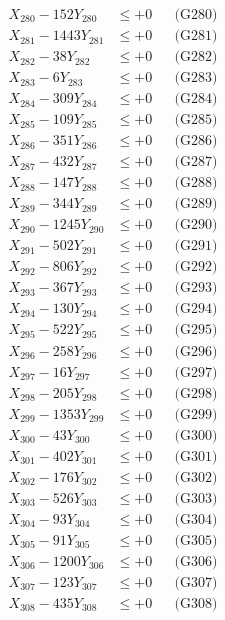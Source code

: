 \documentclass[a4paper,10pt]{article}
\begin{document}
{\begin{align}
X_{280} - 152Y_{280} &\leq +0 && \text{(G280)} \\
\allowbreak
X_{281} - 1443Y_{281} &\leq +0 && \text{(G281)} \\
X_{282} - 38Y_{282} &\leq +0 && \text{(G282)} \\
X_{283} - 6Y_{283} &\leq +0 && \text{(G283)} \\
X_{284} - 309Y_{284} &\leq +0 && \text{(G284)} \\
X_{285} - 109Y_{285} &\leq +0 && \text{(G285)} \\
X_{286} - 351Y_{286} &\leq +0 && \text{(G286)} \\
X_{287} - 432Y_{287} &\leq +0 && \text{(G287)} \\
X_{288} - 147Y_{288} &\leq +0 && \text{(G288)} \\
X_{289} - 344Y_{289} &\leq +0 && \text{(G289)} \\
X_{290} - 1245Y_{290} &\leq +0 && \text{(G290)} \\
\allowbreak
X_{291} - 502Y_{291} &\leq +0 && \text{(G291)} \\
X_{292} - 806Y_{292} &\leq +0 && \text{(G292)} \\
X_{293} - 367Y_{293} &\leq +0 && \text{(G293)} \\
X_{294} - 130Y_{294} &\leq +0 && \text{(G294)} \\
X_{295} - 522Y_{295} &\leq +0 && \text{(G295)} \\
X_{296} - 258Y_{296} &\leq +0 && \text{(G296)} \\
X_{297} - 16Y_{297} &\leq +0 && \text{(G297)} \\
X_{298} - 205Y_{298} &\leq +0 && \text{(G298)} \\
X_{299} - 1353Y_{299} &\leq +0 && \text{(G299)} \\
X_{300} - 43Y_{300} &\leq +0 && \text{(G300)} \\
\allowbreak
X_{301} - 402Y_{301} &\leq +0 && \text{(G301)} \\
X_{302} - 176Y_{302} &\leq +0 && \text{(G302)} \\
X_{303} - 526Y_{303} &\leq +0 && \text{(G303)} \\
X_{304} - 93Y_{304} &\leq +0 && \text{(G304)} \\
X_{305} - 91Y_{305} &\leq +0 && \text{(G305)} \\
X_{306} - 1200Y_{306} &\leq +0 && \text{(G306)} \\
X_{307} - 123Y_{307} &\leq +0 && \text{(G307)} \\
X_{308} - 435Y_{308} &\leq +0 && \text{(G308)} \\

\end{align}}
\end{document}
